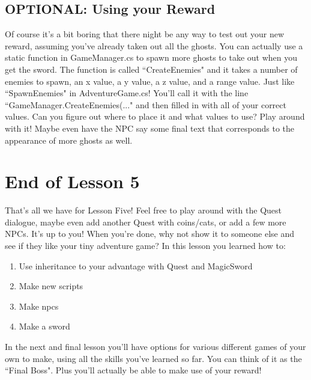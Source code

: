 \documentclass{article}
\begin{document}
\noindent{}

\subsection{OPTIONAL: Using your Reward}

Of course it's a bit boring that there night be any way to test out your new reward, assuming you've already taken out all the ghosts. You can actually use a static function in GameManager.cs to spawn more ghosts to take out when you get the sword. The function is called ``CreateEnemies" and it takes a number of enemies to spawn, an x value, a y value, a z value, and a range value. Just like ``SpawnEnemies" in AdventureGame.cs! You'll call it with the line ``GameManager.CreateEnemies(..." and then filled in with all of your correct values. Can you figure out where to place it and what values to use? Play around with it! Maybe even have the NPC say some final text that corresponds to the appearance of more ghosts as well.

\section{End of Lesson 5}

That's all we have for Lesson Five! Feel free to play around with the Quest dialogue, maybe even add another Quest with coins/cats, or add a few more NPCs. It's up to you! When you're done, why not show it to someone else and see if they like your tiny adventure game? In this lesson you learned how to:

\begin{enumerate}
 \item Use inheritance to your advantage with Quest and MagicSword
 \item Make new scripts
 \item Make npcs
 \item Make a sword
\end{enumerate}

In the next and final lesson you'll have options for various different games of your own to make, using all the skills you've learned so far. You can think of it as the ``Final Boss". Plus you'll actually be able to make use of your reward!
\end{document}
